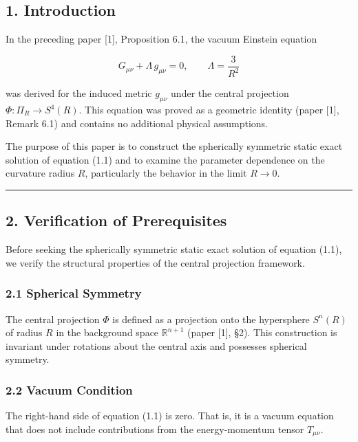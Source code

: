 \documentclass[a4paper,11pt]{article}
\theoremstyle{definition}
\begin{document}
\subsection{1. Introduction}\label{introduction}

In the preceding paper {[}1{]}, Proposition 6.1, the vacuum Einstein
equation

\[G_{\mu\nu} + \Lambda\, g_{\mu\nu} = 0, \qquad \Lambda = \frac{3}{R^2} \tag{1.1}\]

was derived for the induced metric \(g_{\mu\nu}\) under the central
projection \(\Phi : \Pi_R \to S^4(R)\). This equation was proved as a
geometric identity (paper {[}1{]}, Remark 6.1) and contains no
additional physical assumptions.

The purpose of this paper is to construct the spherically symmetric
static exact solution of equation (1.1) and to examine the parameter
dependence on the curvature radius \(R\), particularly the behavior in
the limit \(R \to 0\).

\begin{center}\rule{0.5\linewidth}{0.5pt}\end{center}

\subsection{2. Verification of
Prerequisites}\label{verification-of-prerequisites}

Before seeking the spherically symmetric static exact solution of
equation (1.1), we verify the structural properties of the central
projection framework.

\subsubsection{2.1 Spherical Symmetry}\label{spherical-symmetry}

The central projection \(\Phi\) is defined as a projection onto the
hypersphere \(S^n(R)\) of radius \(R\) in the background space
\(\mathbb{R}^{n+1}\) (paper {[}1{]}, §2). This construction is invariant
under rotations about the central axis and possesses spherical symmetry.

\subsubsection{2.2 Vacuum Condition}\label{vacuum-condition}

The right-hand side of equation (1.1) is zero. That is, it is a vacuum
equation that does not include contributions from the energy-momentum
tensor \(T_{\mu\nu}\).
\end{document}
